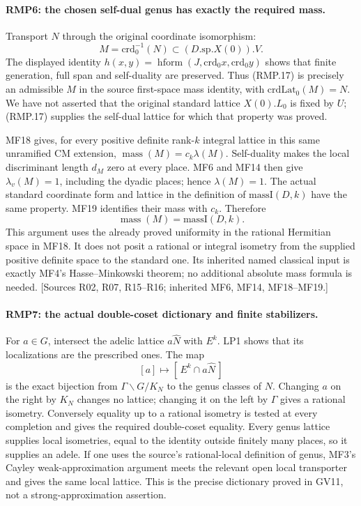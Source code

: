 \paragraph{RMP6: the chosen self-dual genus has exactly the required mass.}
\label{claim:RMP6}
Transport $N$ through the original coordinate isomorphism:
\[
              M=\mathrm{crd}_0^{-1}(N)
                  \subset(D.\mathrm{sp}.X(0)).V.       \tag{RMP.17}
\]
The displayed identity
$h(x,y)=\operatorname{hform}(J,\mathrm{crd}_0x,\mathrm{crd}_0y)$
shows that finite generation, full span and self-duality are
preserved. Thus (RMP.17) is precisely an admissible $M$ in the
source first-space mass identity, with $\mathrm{crdLat}_0(M)=N$. We have not asserted that the original
standard lattice $X(0).L_0$ is fixed by $U$; (RMP.17) supplies the
self-dual lattice for which that property was proved.

MF18 gives, for every positive definite rank-$k$ integral lattice
in this same unramified CM extension,
$\operatorname{mass}(M)=c_k\lambda(M)$.
Self-duality makes the local discriminant length $d_M$ zero at
every place. MF6 and MF14 then give
$\lambda_v(M)=1$, including the dyadic places; hence
$\lambda(M)=1$. The actual standard coordinate form and lattice
in the definition of $\mathrm{massI}(D,k)$ have the same property.
MF19 identifies their mass with $c_k$. Therefore
\[
             \operatorname{mass}(M)=\mathrm{massI}(D,k).
                                                               \tag{RMP.18}
\]
This argument uses the already proved uniformity in the rational
Hermitian space in MF18. It does not posit a rational or integral
isometry from the supplied positive definite space to the standard
one. Its inherited named classical input is exactly MF4's
Hasse--Minkowski theorem; no additional absolute mass formula is
needed. [Sources R02, R07, R15--R16; inherited MF6, MF14,
MF18--MF19.]

\paragraph{RMP7: the actual double-coset dictionary and finite stabilizers.}
\label{claim:RMP7}
For $a\in G$, intersect the adelic lattice $a\widehat N$ with
$E^k$. LP1 shows that its localizations are the prescribed ones.
The map
\[
 [a]\longmapsto[\,E^k\cap a\widehat N\,]
                                                               \tag{RMP.19}
\]
is the exact bijection from $\Gamma\backslash G/K_N$ to the
genus classes of $N$. Changing $a$ on the right by $K_N$ changes
no lattice; changing it on the left by $\Gamma$ gives a rational
isometry. Conversely equality up to a rational isometry is tested
at every completion and gives the required double-coset equality.
Every genus lattice supplies local isometries, equal to the identity
outside finitely many places, so it supplies an adele. If one uses
the source's rational-local definition of genus, MF3's Cayley
weak-approximation argument meets the relevant open local
transporter and gives the same local lattice. This is the precise
dictionary proved in GV11, not a strong-approximation assertion.

